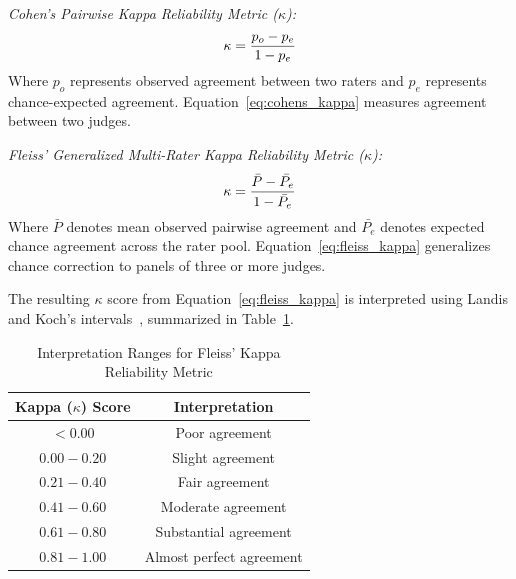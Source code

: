     \noindent\textit{Cohen's Pairwise Kappa Reliability Metric ($\kappa$):}
    \begin{equation}
        \kappa = \frac{p_o - p_e}{1 - p_e}
        \label{eq:cohens_kappa}
        \eqcaption{Cohen's Pairwise Kappa Reliability Metric ($\kappa$)}
    \end{equation}
    \noindent Where $p_o$ represents observed agreement between two raters and $p_e$ represents chance-expected agreement. Equation~\eqref{eq:cohens_kappa} measures agreement between two judges.

    \noindent\textit{Fleiss' Generalized Multi-Rater Kappa Reliability Metric ($\kappa$):}
    \begin{equation}
        \kappa = \frac{\bar{P} - \bar{P_e}}{1 - \bar{P_e}}
        \label{eq:fleiss_kappa}
        \eqcaption{Fleiss' Generalized Multi-Rater Kappa Reliability Metric ($\kappa$)}
    \end{equation}
    \noindent Where $\bar{P}$ denotes mean observed pairwise agreement and $\bar{P_e}$ denotes expected chance agreement across the rater pool. Equation~\eqref{eq:fleiss_kappa} generalizes chance correction to panels of three or more judges.

    The resulting $\kappa$ score from Equation~\eqref{eq:fleiss_kappa} is interpreted using Landis and Koch's intervals~\cite{landis1977measurement}, summarized in Table~\ref{tab:kappa_interpretation}.
    
    \begin{table}[htbp]
        \centering
        \caption[Interpretation Ranges for Fleiss' Kappa Reliability Metric]{Interpretation Ranges for Fleiss' Kappa Reliability Metric}
        \label{tab:kappa_interpretation}
        \begin{tabular}{@{}cc@{}}
            \toprule
            \textbf{Kappa ($\kappa$) Score} & \textbf{Interpretation} \\
            \midrule
            $< 0.00$ & Poor agreement \\
            $0.00 - 0.20$ & Slight agreement \\
            $0.21 - 0.40$ & Fair agreement \\
            $0.41 - 0.60$ & Moderate agreement \\
            $0.61 - 0.80$ & Substantial agreement \\
            $0.81 - 1.00$ & Almost perfect agreement \\
            \bottomrule
        \end{tabular}
    \end{table}

